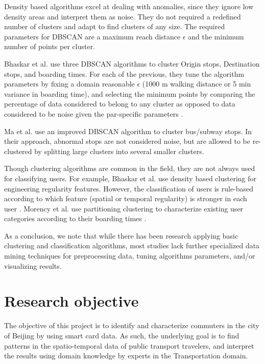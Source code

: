 \documentclass{article}
\begin{document}
Density based algorithms excel at dealing with anomalies, since they ignore low density areas and interpret them as noise. They do not required a redefined number of clusters and adapt to find clusters of any size. The required parameters for DBSCAN are a maximum reach distance $\epsilon$ and the minimum number of points per cluster.

Bhaskar et al. use three DBSCAN algorithms to cluster Origin stops, Destination stops, and boarding times. For each of the previous, they tune the algorithm parameters by fixing a domain reasonable $\epsilon$ (1000 m walking distance or 5 min variance in boarding time), and selecting the minimum points by comparing the percentage of data considered to belong to any cluster as opposed to data considered to be noise given the par-specific parameters \cite{bhaskar2015passenger}. 

Ma et al. use an improved DBSCAN algorithm to cluster bus/subway stops. In their approach, abnormal stops are not considered noise, but are allowed to be re-clustered by splitting large clusters into several smaller clusters. 

Though clustering algorithms are common in the field, they are not always used for classifying users. For example, Bhaskar et al. use density based clustering for engineering regularity features. However, the classification of users is rule-based according to which feature (spatial or temporal regularity) is stronger in each user \cite{bhaskar2015passenger}. Morency et al. use partitioning clustering to characterize existing user categories according to their boarding times \cite{morency2007measuring}. 



As a conclusion, we note that while there has been research applying basic clustering and classification algorithms, most studies lack further specialized data mining techniques for preprocessing data, tuning algorithms parameters, and/or visualizing results. 

\newpage
\section{Research objective}
The objective of this project is to identify and characterize commuters in the city of Beijing by using smart card data. As such, the underlying goal is to find patterns in the spatio-temporal data of public transport travelers, and interpret the results using domain knowledge by experts in the Transportation domain.  
\end{document}

